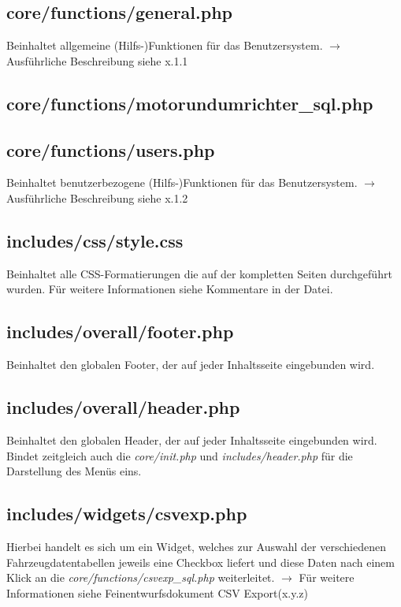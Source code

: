 \documentclass[fontsize = 12pt, paper = a4]{scrreprt}
\begin{document}
\subsection{core/functions/general.php}
Beinhaltet allgemeine (Hilfs-)Funktionen für das Benutzersystem.
$\rightarrow$ Ausführliche Beschreibung siehe x.1.1

\subsection{core/functions/motorundumrichter\_sql.php}

\subsection{core/functions/users.php}
Beinhaltet benutzerbezogene (Hilfs-)Funktionen für das Benutzersystem.
$\rightarrow$ Ausführliche Beschreibung siehe x.1.2

\subsection{includes/css/style.css}
Beinhaltet alle CSS-Formatierungen die auf der kompletten Seiten durchgeführt wurden. Für weitere Informationen siehe Kommentare in der Datei.

\subsection{includes/overall/footer.php}
Beinhaltet den globalen Footer, der auf jeder Inhaltsseite eingebunden wird.

\subsection{includes/overall/header.php}
Beinhaltet den globalen Header, der auf jeder Inhaltsseite eingebunden wird. Bindet zeitgleich auch die \textit{core/init.php} und \textit{includes/header.php} für die Darstellung des Menüs eins.

\subsection{includes/widgets/csvexp.php}
Hierbei handelt es sich um ein Widget, welches zur Auswahl der verschiedenen Fahrzeugdatentabellen jeweils eine Checkbox liefert und diese Daten nach einem Klick an die \textit{core/functions/csvexp\_sql.php} weiterleitet.
$\rightarrow$ Für weitere Informationen siehe Feinentwurfsdokument \glqq CSV Export\grqq (x.y.z)
\end{document}
